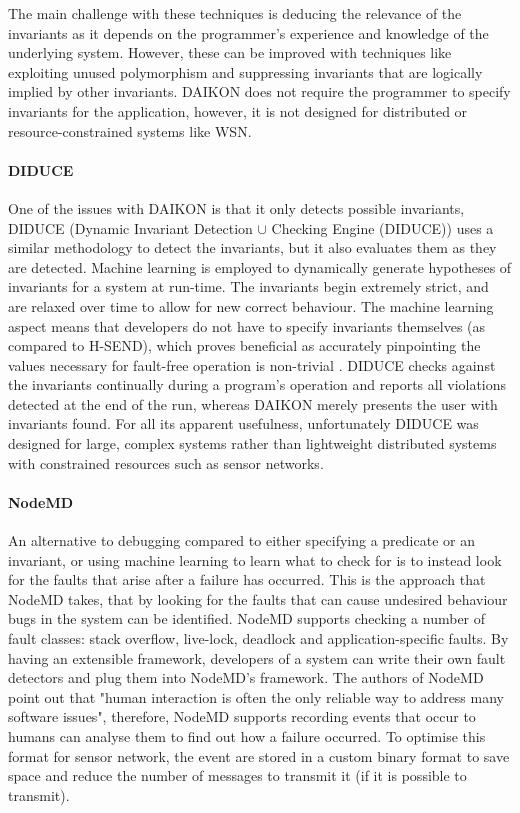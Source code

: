 The main challenge with these techniques is deducing the relevance of the invariants as it depends on the programmer's experience and knowledge of the underlying system. However, these can be improved with techniques like exploiting unused polymorphism and suppressing invariants that are logically implied by other invariants. DAIKON does not require the programmer to specify invariants for the application, however, it is not designed for distributed or resource-constrained systems like WSN.

\paragraph{DIDUCE} One of the issues with DAIKON is that it only detects possible invariants, DIDUCE \cite{diduce} (Dynamic Invariant Detection $\cup$ Checking Engine (DIDUCE)) uses a similar methodology to detect the invariants, but it also evaluates them as they are detected. Machine learning is employed to dynamically generate hypotheses of invariants for a system at run-time. The invariants begin extremely strict, and are relaxed over time to allow for new correct behaviour. The machine learning aspect means that developers do not have to specify invariants themselves (as compared to H-SEND), which proves beneficial as accurately pinpointing the values necessary for fault-free operation is non-trivial \cite{?}. DIDUCE checks against the invariants continually during a program's operation and reports all violations detected at the end of the run, whereas DAIKON merely presents the user with invariants found. For all its apparent usefulness, unfortunately DIDUCE was designed for large, complex systems rather than lightweight distributed systems with constrained resources such as sensor networks.

\paragraph{NodeMD} An alternative to debugging compared to either specifying a predicate or an invariant, or using machine learning to learn what to check for is to instead look for the faults that arise after a failure has occurred. This is the approach that NodeMD \cite{NodeMD} takes, that by looking for the faults that can cause undesired behaviour bugs in the system can be identified. NodeMD supports checking a number of fault classes: stack overflow, live-lock, deadlock and application-specific faults. By having an extensible framework, developers of a system can write their own fault detectors and plug them into NodeMD's framework. The authors of NodeMD point out that "human interaction is often the only reliable way to address many software issues", therefore, NodeMD supports recording events that occur to humans can analyse them to find out how a failure occurred. To optimise this format for sensor network, the event are stored in a custom binary format to save space and reduce the number of messages to transmit it (if it is possible to transmit).

